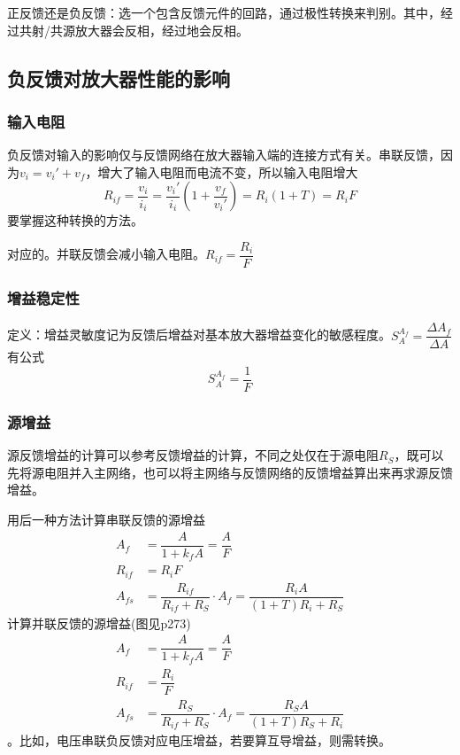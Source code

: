 \documentclass{ctexart}
\begin{document}
正反馈还是负反馈：选一个包含反馈元件的回路，通过极性转换来判别。其中，经过共射/共源放大器会反相，经过地会反相。
\subsection{负反馈对放大器性能的影响}
\subsubsection{输入电阻}
负反馈对输入的影响仅与反馈网络在放大器输入端的连接方式有关。串联反馈，因为$v_i=v_i'+v_f$，增大了输入电阻而电流不变，所以输入电阻增大
\begin{equation}
    R_{if}=\dfrac{v_i}{i_i}=\dfrac{v_i'}{i_i}(1+\dfrac{v_f}{v_i'})=R_i(1+T)=R_i F
\end{equation}
要掌握这种转换的方法。

对应的。并联反馈会减小输入电阻。$ R_{if}=\dfrac{R_i}{F}$
\subsubsection{增益稳定性}
定义：增益灵敏度记为反馈后增益对基本放大器增益变化的敏感程度。$S^{A_f}_A=\dfrac{\Delta A_f}{\Delta A}$
有公式
\begin{equation}
    S^{A_f}_A=\dfrac{1}{F}
\end{equation}
\subsubsection{源增益}
源反馈增益的计算可以参考反馈增益的计算，不同之处仅在于源电阻$R_S$，既可以先将源电阻并入主网络，也可以将主网络与反馈网络的反馈增益算出来再求源反馈增益。

用后一种方法计算串联反馈的源增益
\begin{align}
    A_f&=\dfrac{A}{1+k_f A}=\dfrac{A}{F}\\
    R_{if}&=R_i F\\
    A_{fs}&=\dfrac{R_{if}}{R_{if}+R_S}\cdot A_f=\dfrac{R_i A}{(1+T)R_i+R_S}
\end{align}
计算并联反馈的源增益(图见p273)
\begin{align}
    A_f&=\dfrac{A}{1+k_f A}=\dfrac{A}{F}\\
    R_{if}&=\dfrac{R_i}{F}\\
    A_{fs}&=\dfrac{R_{S}}{R_{if}+R_S}\cdot A_f=\dfrac{R_S A}{(1+T)R_S+R_i}
\end{align}
{\color{red}{有关反馈的公式，只能在对应类型的增益计算中使用，若要计算其他类型的增益，必须进行增益的转换}}。比如，电压串联负反馈对应电压增益，若要算互导增益，则需转换。
\end{document}
